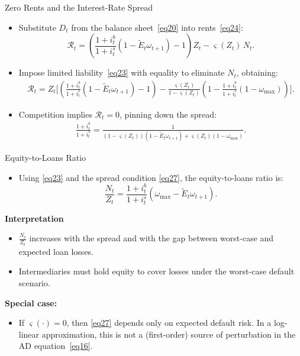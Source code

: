 \documentclass[11pt,aspectratio=169]{beamer}
\begin{document}
\begin{frame}{Zero Rents and the Interest-Rate Spread}
\small
\begin{itemize}
  \item Substitute $D_t$ from the balance sheet~\eqref{eq20} into rents~\eqref{eq24}:
  \[
    \mathcal{R}_t
    =\left(\frac{1+i_t^b}{1+i_t^s}\left(1-\tilde{E}_t\omega_{t+1}\right)-1\right)Z_t
    -\varsigma(Z_t)\,N_t .
  \]
  \vspace{0.25em}
  \item Impose limited liability~\eqref{eq23} with equality to eliminate $N_t$, obtaining:
  \begin{align}
    \mathcal{R}_t
    = Z_t\Bigg[
      \left(\frac{1+i_t^b}{1+i_t^s}\left(1-\tilde{E}_t\omega_{t+1}\right)-1\right)
      -\frac{\varsigma(Z_t)}{1-\varsigma(Z_t)}
      \left(1-\frac{1+i_t^b}{1+i_t^s}(1-\omega_{\max})\right)
    \Bigg].
    \label{eq26}
  \end{align}
  \vspace{0.25em}
  \item Competition implies $\mathcal{R}_t=0$, pinning down the spread:
  \begin{align}
    \frac{1+i_t^b}{1+i_t^s}
    = \frac{1}{(1-\varsigma(Z_t))\left(1-\tilde{E}_t\omega_{t+1}\right)
    + \varsigma(Z_t)\left(1-\omega_{\max}\right)}.
    \label{eq27}
  \end{align}
\end{itemize}
\end{frame}

\begin{frame}{Equity-to-Loans Ratio}
\small
\begin{itemize}
  \item Using \eqref{eq23} and the spread condition \eqref{eq27}, the equity-to-loans ratio is:
  \[
    \frac{N_t}{Z_t}
    =\frac{1+i_t^b}{1+i_t^s}\left(\omega_{\max}-\tilde{E}_t\omega_{t+1}\right).
  \]
  \vspace{0.25em}
\end{itemize}
\textbf{Interpretation
}  
\begin{itemize}
    \item $\frac{N_t}{Z_t}$ increases with the spread and with the gap between worst-case and expected loan losses.
    \item Intermediaries must hold equity to cover losses under the worst-case default scenario.
  \end{itemize}
\textbf{Special case:}
\begin{itemize}
  \vspace{0.25em}
  \item If $\varsigma(\cdot)=0$, then \eqref{eq27} depends only on expected default risk.
  In a log-linear approximation, this is not a (first-order) source of perturbation in the AD equation~\eqref{eq16}.
\end{itemize}
\end{frame}
\end{document}
